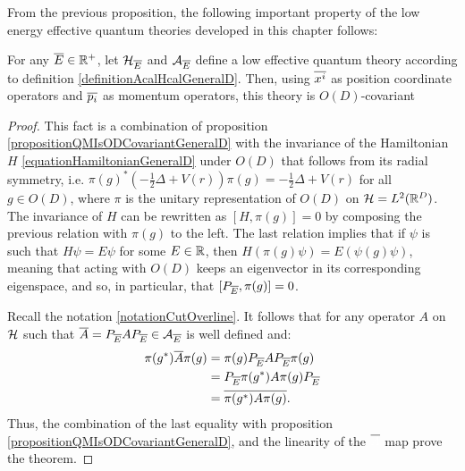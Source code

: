From the previous proposition, the following important property of the low energy effective quantum theories developed in this chapter follows:
\begin{theorem}\label{theoremGeneralDEffectiveLowEnergyQuantumIsODCovariant}
For any $\overline{E} \in \mathbb{R}^+$, let $\mathcal H_{\overline{E}}$ and $\mathcal A_{\overline{E}}$ define a low effective quantum theory according to definition \ref{definitionAcalHcalGeneralD}. Then, using $\overline{x^i}$ as position coordinate operators and $\overline{p_i}$ as momentum operators, this theory is $O(D)$-covariant
\end{theorem}
\begin{proof}
This fact is a combination of proposition \ref{propositionQMIsODCovariantGeneralD} with the invariance of the Hamiltonian $H$ \eqref{equationHamiltonianGeneralD} under $O(D)$ that follows from its radial symmetry, i.e. $\pi(g)^* (-\frac{1}{2} \Delta + V(r)) \pi(g) = -\frac{1}{2} \Delta + V(r)$ for all $g \in O(D)$, where $\pi$ is the unitary representation of $O(D)$ on $\mathcal H = L^2(\mathbb{R}^D)$. The invariance of $H$ can be rewritten as $[H, \pi(g)] = 0$ by composing the previous relation with $\pi(g)$ to the left. The last relation implies that if $\psi$ is such that $H \psi = E \psi$ for some $E \in \mathbb{R}$, then $H(\pi(g)\psi) = E(\psi(g)\psi)$, meaning that acting with $O(D)$ keeps an eigenvector in its corresponding eigenspace, and so, in particular, that $[P_{\overline{E}}, \pi(g)] = 0$.

Recall the notation \ref{notationCutOverline}. It follows that for any operator $A$ on $\mathcal H$ such that $\overline{A} = P_{\overline{E}} A P_{\overline{E}} \in \mathcal A_{\overline{E}}$ is well defined and:
\begin{align*}
    \pi(g^*) \overline{A} \pi(g) 
      &= \pi(g)P_{\overline{E}} A P_{\overline{E}} \pi(g)\\
      &= P_{\overline{E}} \pi(g^*) A \pi(g) P_{\overline{E}}\\
      &= \overline{\pi(g^*) A \pi(g)}.
\end{align*}
Thus, the combination of the last equality with proposition \ref{propositionQMIsODCovariantGeneralD}, and the linearity of the $\cut{\color{white} A}$ map prove the theorem.
\end{proof}


